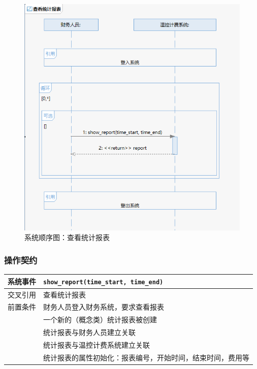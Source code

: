 \documentclass[black,normal,cn]{elegantnote}
\newcommand{\code}[1]{\colorbox{light-gray}{\texttt{#1}}}
\begin{document}
\begin{figure}[H]
    \centering
    \includegraphics[width=.8\textwidth]{fig/276002.png}
    \caption{系统顺序图：查看统计报表}
    \label{fig:276002}
\end{figure}

\subsubsection{操作契约}

\begin{center}
    \begin{tabular}{|>{\centering}m{}|m{}|}
        \hline
        系统事件                  & \multicolumn{1}{l|}{\code{show\_report(time\_start, time\_end)}} \\
        \hline
        交叉引用                  & 查看统计报表                                                     \\
        \hline
        前置条件                  & 财务人员登入财务系统，要求查看报表                               \\
        \hline
        \multirow{4}{*}{后置条件} & 一个新的（概念类）统计报表被创建                                 \\
        \cline{2-2}
                                  & 统计报表与财务人员建立关联                                       \\
        \cline{2-2}
                                  & 统计报表与温控计费系统建立关联                                   \\
        \cline{2-2}
                                  & 统计报表的属性初始化：报表编号，开始时间，结束时间，费用等       \\
        \hline
    \end{tabular}
\end{center}
\end{document}

